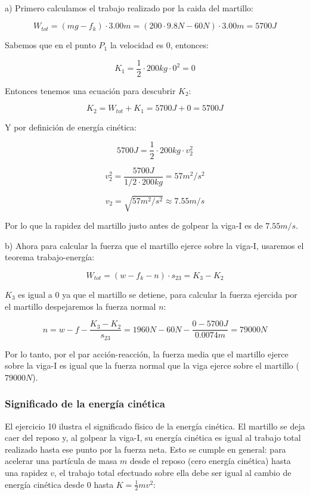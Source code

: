 \documentclass{article}
\newcommand{\newtitle}[1]{
    \color{titleColor}
    \subsubsection{\textbf{#1}}
    \color{black}
}
\newcommand{\newex}[1]{
    \vspace{0.5cm}
    \noindent{\large \color{exerciceColor} \textbf{#1}}\\[0.2cm]
}
\begin{document}
    \newex{Solución 10.}

    \par a) Primero calculamos el trabajo realizado por la caida del martillo:

    \[ W_{tot} = (mg - f_{k}) \cdot 3.00 m = (200 \cdot 9.8 N - 60 N) \cdot 3.00 m = 5700 J\]

    \par Sabemos que en el punto $P_1$ la velocidad es 0, entonces:

    \[ K_1 = \frac{1}{2} \cdot 200 kg \cdot 0^2 = 0 \]

    \par Entonces tenemos una ecuación para descubrir $K_2$:

    \[ K_2 = W_{tot} + K_1 = 5700 J + 0 = 5700 J \]

    \par Y por definición de energía cinética:

    \[ 5700J = \frac{1}{2} \cdot 200 kg \cdot v_2^2 \]

    \[ v_2^2 = \frac{5700 J}{1/2 \cdot 200 kg} = 57 m^2/s^2 \]

    \[ v_2 = \sqrt{57 m^2/s^2} \approx 7.55 m/s \]

    \par Por lo que la rapidez del martillo justo antes de golpear la viga-I es de $7.55 m/s$.

    \vspace{1cm}

    \par b) Ahora para calcular la fuerza que el martillo ejerce sobre la viga-I, usaremos el teorema trabajo-energía:

    \[ W_{tot} = (w - f_k - n) \cdot s_{23} = K_3 - K_2 \]

    \par $K_3$ es igual a 0 ya que el martillo se detiene, para calcular la fuerza ejercida por el martillo despejaremos la fuerza normal $n$:

    \[ n = w - f - \frac{K_3 - K_2}{s_{23}} = 1960 N - 60 N - \frac{0 - 5700 J}{0.0074 m} = 79000 N \]

    \par Por lo tanto, por el par acción-reacción, la fuerza media que el martillo ejerce sobre la viga-I es igual que la fuerza normal que la viga ejerce sobre el martillo ($79000 N$).

    \newtitle{Significado de la energía cinética}

    \par El ejercicio 10 ilustra el significado físico de la energía cinética. El martillo se deja caer del reposo y, al golpear la viga-I, su energía cinética es igual al trabajo total realizado hasta ese punto por la fuerza neta. Esto se cumple en general: para acelerar una partícula de masa $m$ desde el reposo (cero energía cinética) hasta una rapidez $v$, el trabajo total efectuado sobre ella debe ser igual al cambio de energía cinética desde 0 hasta $K = \frac{1}{2}mv^2$:
\end{document}
